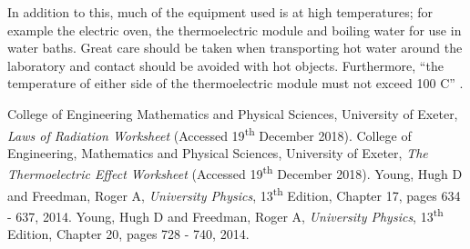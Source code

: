 \documentclass{article}
\begin{document}
\vspace{2mm}
\noindent
In addition to this, much of the equipment used is at high temperatures; for example the electric oven, the thermoelectric module and boiling water for use in water baths. Great care should be taken when transporting hot water around the laboratory and contact should be avoided with hot objects. Furthermore, ``the temperature of either side of the thermoelectric module must not exceed 100 C'' \cite{Paper01}. 












\begin{thebibliography}{9}
 College of Engineering Mathematics and Physical Sciences, University of Exeter, \textit{Laws of Radiation Worksheet} (Accessed 19\textsuperscript{th} December 2018).
 College of Engineering, Mathematics and Physical Sciences, University of Exeter, \textit{The Thermoelectric Effect Worksheet} (Accessed 19\textsuperscript{th} December 2018).
 Young, Hugh D and Freedman, Roger A, \textit{University Physics}, 13\textsuperscript{th} Edition, Chapter 17, pages 634 - 637, 2014.
 Young, Hugh D and Freedman, Roger A, \textit{University Physics}, 13\textsuperscript{th} Edition, Chapter 20, pages 728 - 740, 2014.
\end{thebibliography}
\end{document}
